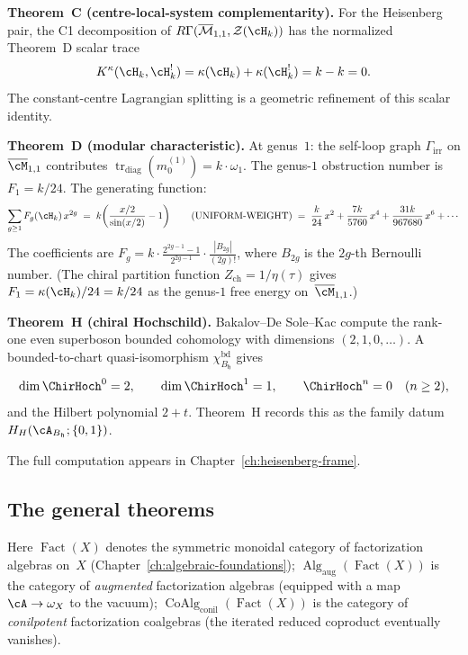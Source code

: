 \smallskip
\noindent\textbf{Theorem~C (centre-local-system complementarity).}\enspace
For the Heisenberg pair, the C1 decomposition of
$R\Gamma(\overline{\mathcal M}_{1,1},\mathcal Z(\cH_k))$ has the
normalized Theorem~D scalar trace
\[
K^\kappa(\cH_k,\cH_k^!)
=\kappa(\cH_k)+\kappa(\cH_k^!)
=k-k=0 .
\]
The constant-centre Lagrangian splitting is a geometric refinement of
this scalar identity.

\smallskip
\noindent\textbf{Theorem~D (modular characteristic).}\enspace
At genus~$1$: the self-loop graph $\Gamma_{\mathrm{irr}}$ on
$\overline{\cM}_{1,1}$ contributes
$\operatorname{tr}_{\mathrm{diag}}(m_0^{(1)}) = k \cdot \omega_1$.
The genus-$1$
obstruction number is $F_1 = k/24$. The generating function:
\[
\sum_{g \ge 1} F_g(\cH_k)\,x^{2g}
\;=\;
k\!\left(\frac{x/2}{\sin(x/2)} - 1\right)
\qquad \textup{(UNIFORM-WEIGHT)}
\;=\;
\frac{k}{24}\,x^2
+ \frac{7k}{5760}\,x^4
+ \frac{31k}{967680}\,x^6
+ \cdots
\]
The coefficients are
$F_g = k \cdot \frac{2^{2g-1}-1}{2^{2g-1}} \cdot
\frac{|B_{2g}|}{(2g)!}$,
where $B_{2g}$ is the $2g$-th Bernoulli number.
(The chiral partition function
$Z_{\mathrm{ch}} = 1/\eta(\tau)$ gives
$F_1 = \kappa(\cH_k)/24 = k/24$
as the genus-$1$ free energy on~$\overline{\cM}_{1,1}$.)

\smallskip
\noindent\textbf{Theorem~H (chiral Hochschild).}\enspace
Bakalov--De Sole--Kac compute the rank-one even superboson bounded
cohomology with dimensions $(2,1,0,\ldots)$.  A bounded-to-chart
quasi-isomorphism
$\chi_{B_{\mathfrak h}}^{\mathrm{bd}}$ gives
\[
 \dim\ChirHoch^0=2,\qquad
 \dim\ChirHoch^1=1,\qquad
 \ChirHoch^n=0\quad(n\geq2),
\]
and the Hilbert polynomial $2+t$.  Theorem~H records this as the
family datum $H_H(\cA_{B_{\mathfrak h}};\{0,1\})$.

The full computation appears in Chapter~\ref{ch:heisenberg-frame}.

\subsection{The general theorems}
\label{subsec:five-theorems-general}

Here $\operatorname{Fact}(X)$ denotes the symmetric
monoidal category of factorization algebras on~$X$
(Chapter~\ref{ch:algebraic-foundations});
$\operatorname{Alg}_{\mathrm{aug}}(\operatorname{Fact}(X))$
is the category of \emph{augmented} factorization algebras
(equipped with a map $\cA \to \omega_X$ to the vacuum);
$\operatorname{CoAlg}_{\mathrm{conil}}(\operatorname{Fact}(X))$
is the category of \emph{conilpotent} factorization
coalgebras (the iterated reduced coproduct eventually
vanishes).

